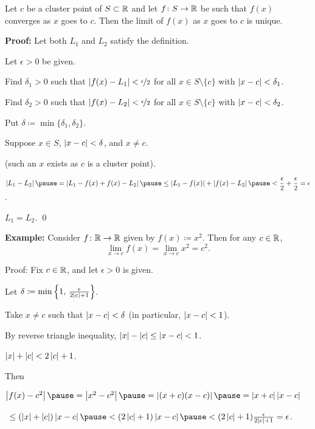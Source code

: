 \documentclass[10pt,aspectratio=169]{beamer}
\begin{document}
\begin{frame}

\begin{proposition}
Let $c$ be a cluster point of $S \subset {\mathbb{R}}$ and let $f \colon S \to {\mathbb{R}}$
be such that $f(x)$ converges as $x$ goes to $c$.
\pause
Then the limit of $f(x)$ as $x$ goes to $c$ is unique.
\end{proposition}

\pause
\textbf{Proof:}
Let both $L_1$ and $L_2$ satisfy the definition.

\pause
Let $\epsilon > 0$ be given.

\pause
Find $\delta_1 > 0$ such that $\left\lvert {f(x)-L_1} \right\rvert < \nicefrac{\epsilon}{2}$ 
for all $x \in S \setminus \{c\}$ with $\left\lvert {x-c} \right\rvert < \delta_1$.

\pause
Find $\delta_2 > 0$ such that $\left\lvert {f(x)-L_2} \right\rvert < \nicefrac{\epsilon}{2}$
for all $x \in S \setminus \{c\}$ with $\left\lvert {x-c} \right\rvert < \delta_2$.

\pause
Put $\delta \coloneqq \min \{ \delta_1, \delta_2 \}$.

\pause
Suppose $x \in S$, $\left\lvert {x-c} \right\rvert < \delta$, and $x \not= c$.

(such an $x$ exists as $c$ is a cluster point).

\pause
\medskip

$\displaystyle
\abs{L_1 - L_2}
\pause
=
\abs{L_1 - f(x) + f(x) - L_2}
\pause
\leq
\abs{L_1 - f(x)} + \abs{f(x) - L_2}
\pause
<
\frac{\epsilon}{2} + \frac{\epsilon}{2}
= \epsilon$.

\pause
\medskip

\thus \quad $L_1 = L_2$.
\qed
\end{frame}

\begin{frame}

\textbf{Example:}
Consider $f \colon {\mathbb{R}} \to {\mathbb{R}}$ given by $f(x) \coloneqq x^2$.  Then
for any $c \in {\mathbb{R}}$,
\begin{equation*}
\lim_{x\to c} f(x) = \lim_{x\to c} x^2 = c^2 .
\end{equation*}

\pause
Proof: Fix $c \in {\mathbb{R}}$, and let $\epsilon > 0$ is given.

\pause
Let $\delta \coloneqq \min \left\{ 1 , \, \frac{\epsilon}{2\left\lvert {c} \right\rvert+1} \right\}$.

\pause
Take $x \not= c$ such that $\left\lvert {x-c} \right\rvert < \delta$ (in particular, $\left\lvert {x-c} \right\rvert < 1$).

\pause
By reverse triangle inequality,
\quad
$\left\lvert {x} \right\rvert-\left\lvert {c} \right\rvert \leq \left\lvert {x-c} \right\rvert < 1$.

\pause
\thus \quad $\left\lvert {x} \right\rvert + \left\lvert {c} \right\rvert < 2\left\lvert {c} \right\rvert + 1$.

\pause
\medskip

Then

\medskip

$\abs{f(x) - c^2}
\pause
= \abs{x^2-c^2}
\pause
= \abs{(x+c)(x-c)}
\pause
= \abs{x+c}\abs{x-c}
$

\pause
\medskip

\qquad\qquad\,\!
$
\leq (\abs{x}+\abs{c})\abs{x-c}
\pause
< (2\abs{c}+1)\abs{x-c}
\pause
< (2\abs{c}+1)\frac{\epsilon}{2\abs{c}+1} = \epsilon$.

\end{frame}
\end{document}
